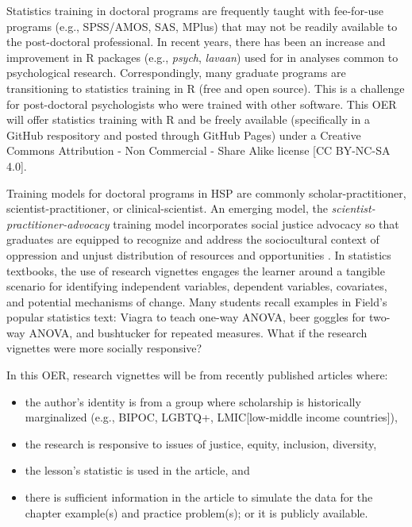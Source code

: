 \documentclass[
  11pt,
]{book}
\providecommand{\tightlist}{%
  \setlength{\itemsep}{0pt}\setlength{\parskip}{0pt}}
\begin{document}
Statistics training in doctoral programs are frequently taught with fee-for-use programs (e.g., SPSS/AMOS, SAS, MPlus) that may not be readily available to the post-doctoral professional. In recent years, there has been an increase and improvement in R packages (e.g., \emph{psych}, \emph{lavaan}) used for in analyses common to psychological research. Correspondingly, many graduate programs are transitioning to statistics training in R (free and open source). This is a challenge for post-doctoral psychologists who were trained with other software. This OER will offer statistics training with R and be freely available (specifically in a GitHub respository and posted through GitHub Pages) under a Creative Commons Attribution - Non Commercial - Share Alike license {[}CC BY-NC-SA 4.0{]}.

Training models for doctoral programs in HSP are commonly scholar-practitioner, scientist-practitioner, or clinical-scientist. An emerging model, the \emph{scientist-practitioner-advocacy} training model incorporates social justice advocacy so that graduates are equipped to recognize and address the sociocultural context of oppression and unjust distribution of resources and opportunities \citep{mallinckrodt_scientist-practitioner-advocate_2014}. In statistics textbooks, the use of research vignettes engages the learner around a tangible scenario for identifying independent variables, dependent variables, covariates, and potential mechanisms of change. Many students recall examples in Field's \citeyearpar{field_discovering_2012} popular statistics text: Viagra to teach one-way ANOVA, beer goggles for two-way ANOVA, and bushtucker for repeated measures. What if the research vignettes were more socially responsive?

In this OER, research vignettes will be from recently published articles where:

\begin{itemize}
\tightlist
\item
  the author's identity is from a group where scholarship is historically marginalized (e.g., BIPOC, LGBTQ+, LMIC{[}low-middle income countries{]}),
\item
  the research is responsive to issues of justice, equity, inclusion, diversity,
\item
  the lesson's statistic is used in the article, and
\item
  there is sufficient information in the article to simulate the data for the chapter example(s) and practice problem(s); or it is publicly available.
\end{itemize}
\end{document}
